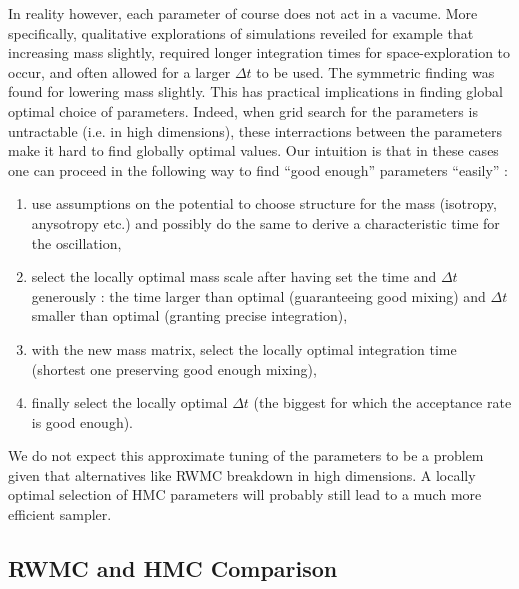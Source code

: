 \documentclass[a4paper, 12pt,oneside]{article}
\begin{document}
			In reality however, each parameter of course does not act in a vacume. More specifically, qualitative explorations of simulations reveiled for example that increasing mass slightly, required longer integration times for space-exploration to occur, and often allowed for a larger $\Delta t$ to be used. The symmetric finding was found for lowering mass slightly. This has practical implications in finding global optimal choice of parameters. Indeed, when grid search for the parameters is untractable (i.e. in high dimensions), these interractions between the parameters make it hard to find globally optimal values. Our intuition is that in these cases one can proceed in the following way to find ``good enough'' parameters ``easily'' : 
			\begin{enumerate}
				\item use assumptions on the potential to choose structure for the mass (isotropy, anysotropy etc.) and possibly do the same to derive a characteristic time for the oscillation,
				\item select the locally optimal mass scale after having set  the time and $\Delta t$ generously : the time larger than optimal (guaranteeing good mixing) and $\Delta t$ smaller than optimal (granting precise integration),
				\item with the new mass matrix, select the locally optimal integration time (shortest one preserving good enough mixing),
				\item finally select the locally optimal $\Delta t$ (the biggest for which the acceptance rate is good enough).
			\end{enumerate}
			We do not expect this approximate tuning of the parameters to be a problem given that alternatives like RWMC breakdown in high dimensions. A locally optimal selection of HMC parameters will probably still lead to a much more efficient sampler.   
		\subsection{RWMC and HMC Comparison}
\end{document}
